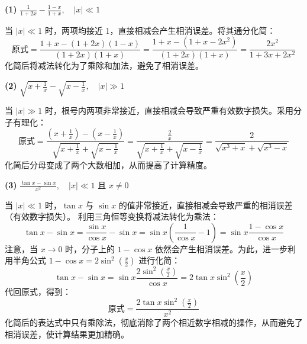 \documentclass[11pt, a4paper]{ctexart} %
\begin{document}
\begin{solution}
    \textbf{(1)} $\frac{1}{1+2x} - \frac{1-x}{1+x}, \quad |x| \ll 1$
    
    当 $|x| \ll 1$ 时，两项均接近 1，直接相减会产生相消误差。将其通分化简：
    \[
        \text{原式} = \frac{1+x - (1+2x)(1-x)}{(1+2x)(1+x)} = \frac{1+x - (1+x-2x^2)}{(1+2x)(1+x)} = \frac{2x^2}{1+3x+2x^2}
    \]
    化简后将减法转化为了乘除和加法，避免了相消误差。
    
    \vspace{1.5em}
    \textbf{(2)} $\sqrt{x+\frac{1}{x}} - \sqrt{x-\frac{1}{x}}, \quad |x| \gg 1$
    
    当 $|x| \gg 1$ 时，根号内两项非常接近，直接相减会导致严重有效数字损失。采用分子有理化：
    \[
        \text{原式} = \frac{\left(x+\frac{1}{x}\right) - \left(x-\frac{1}{x}\right)}{\sqrt{x+\frac{1}{x}} + \sqrt{x-\frac{1}{x}}} 
        = \frac{\frac{2}{x}}{\sqrt{x+\frac{1}{x}} + \sqrt{x-\frac{1}{x}}} 
        = \frac{2}{\sqrt{x^3+x} + \sqrt{x^3-x}}
    \]
    化简后分母变成了两个大数相加，从而提高了计算精度。

    \vspace{1.5em}
    \textbf{(3)} $\frac{\tan x - \sin x}{x^2}, \quad |x| \ll 1 \text{ 且 } x \neq 0$
    
    当 $|x| \ll 1$ 时，$\tan x$ 与 $\sin x$ 的值非常接近，直接相减会导致严重的相消误差（有效数字损失）。
    利用三角恒等变换将减法转化为乘法：
    \[
        \tan x - \sin x = \frac{\sin x}{\cos x} - \sin x = \sin x \left( \frac{1}{\cos x} - 1 \right) = \sin x \frac{1 - \cos x}{\cos x}
    \]
    注意，当 $x \to 0$ 时，分子上的 $1 - \cos x$ 依然会产生相消误差。为此，进一步利用半角公式 $1 - \cos x = 2\sin^2\left(\frac{x}{2}\right)$ 进行化简：
    \[
        \tan x - \sin x = \sin x \frac{2\sin^2\left(\frac{x}{2}\right)}{\cos x} = 2 \tan x \sin^2\left(\frac{x}{2}\right)
    \]
    代回原式，得到：
    \[
        \text{原式} = \frac{2 \tan x \sin^2\left(\frac{x}{2}\right)}{x^2}
    \]
    化简后的表达式中只有乘除法，彻底消除了两个相近数字相减的操作，从而避免了相消误差，使计算结果更加精确。
\end{solution}
\end{document}
